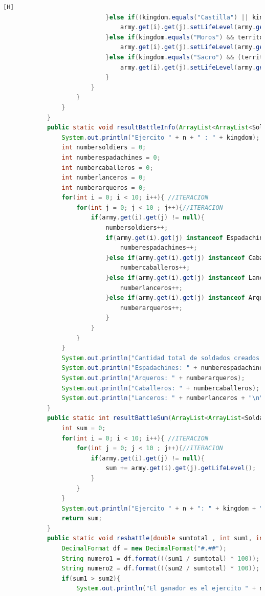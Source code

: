 \documentclass{article}
\begin{document}
\begin{lstlisting}[language=java,caption={Las lineas de codigos de la clase Mapa creada:}][H]
							}else if((kingdom.equals("Castilla") || kingdom.equals("Aragon")) && territory.equals("montana")){
								army.get(i).get(j).setLifeLevel(army.get(i).get(j).getLifeLevel() + 1);
							}else if(kingdom.equals("Moros") && territory.equals("desierto")){
								army.get(i).get(j).setLifeLevel(army.get(i).get(j).getLifeLevel() + 1);
							}else if(kingdom.equals("Sacro") && (territory.equals("desierto") || territory.equals("playa") || territory.equals("campo abierto"))){
								army.get(i).get(j).setLifeLevel(army.get(i).get(j).getLifeLevel() + 1);
							}
						}
					}
				}
			} 
			public static void resultBattleInfo(ArrayList<ArrayList<Soldado>> army, String kingdom, int n){
				System.out.println("Ejercito " + n + " : " + kingdom);
				int numbersoldiers = 0;
				int numberespadachines = 0;
				int numbercaballeros = 0;
				int numberlanceros = 0;
				int numberarqueros = 0;
				for(int i = 0; i < 10; i++){ //ITERACION
					for(int j = 0; j < 10 ; j++){//ITERACION
						if(army.get(i).get(j) != null){
							numbersoldiers++;
							if(army.get(i).get(j) instanceof Espadachin){
								numberespadachines++;
							}else if(army.get(i).get(j) instanceof Caballero){
								numbercaballeros++;
							}else if(army.get(i).get(j) instanceof Lancero){
								numberlanceros++;
							}else if(army.get(i).get(j) instanceof Arquero){
								numberarqueros++;
							}
						}
					}
				}
				System.out.println("Cantidad total de soldados creados: " + numbersoldiers);
				System.out.println("Espadachines: " + numberespadachines);
				System.out.println("Arqueros: " + numberarqueros);
				System.out.println("Caballeros: " + numbercaballeros);
				System.out.println("Lanceros: " + numberlanceros + "\n");
			}
			public static int resultBattleSum(ArrayList<ArrayList<Soldado>> army, String kingdom, int n){
				int sum = 0;
				for(int i = 0; i < 10; i++){ //ITERACION
					for(int j = 0; j < 10 ; j++){//ITERACION
						if(army.get(i).get(j) != null){
							sum += army.get(i).get(j).getLifeLevel();
						}
					}
				}
				System.out.println("Ejercito " + n + ": " + kingdom + ": " + sum);
				return sum;
			}
			public static void resbattle(double sumtotal , int sum1, int sum2 , int n1, int n2 , String kingdom1, String kingdom2){
				DecimalFormat df = new DecimalFormat("#.##");
				String numero1 = df.format(((sum1 / sumtotal) * 100));
				String numero2 = df.format(((sum2 / sumtotal) * 100));
				if(sum1 > sum2){
					System.out.println("El ganador es el ejercito " + n1 + " de: " + kingdom1 +". Ya que al generar los porcentajes de probabilidad de victoria basada en los niveles de vida de sus soldados y aplicando un experimento aleatorio salio vencedor. (Aleatorio generado : "+ numero1 + ")");

\end{lstlisting}
\end{document}
